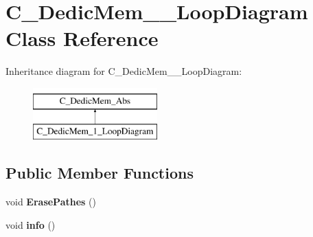\hypertarget{class_c___dedic_mem__1___loop_diagram}{\section{C\-\_\-\-Dedic\-Mem\-\_\-\_\-\-Loop\-Diagram Class Reference}
\label{class_c___dedic_mem__1___loop_diagram}
}
Inheritance diagram for C\-\_\-\-Dedic\-Mem\-\_\-\_\-\-Loop\-Diagram\-:\begin{figure}[H]
\begin{center}
\leavevmode
\includegraphics[height=2.000000cm]{class_c___dedic_mem__1___loop_diagram}
\end{center}
\end{figure}
\subsection*{Public Member Functions}
\begin{DoxyCompactItemize}
\item 
\hypertarget{class_c___dedic_mem__1___loop_diagram_a7e471caa4ce037b77ee17fdcbd6659bb}{void {\bfseries Erase\-Pathes} ()}\label{class_c___dedic_mem__1___loop_diagram_a7e471caa4ce037b77ee17fdcbd6659bb}

\item 
\hypertarget{class_c___dedic_mem__1___loop_diagram_a9c9b82658d4328a307cf4b47e9b5cfcd}{void {\bfseries info} ()}\label{class_c___dedic_mem__1___loop_diagram_a9c9b82658d4328a307cf4b47e9b5cfcd}

\end{DoxyCompactItemize}
